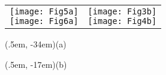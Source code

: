 \documentclass[varwidth=24em]{standalone}
\begin{document}
\begin{tabular}[c]{p{23em}p{50em}}
\shortstack[c]{
 \texttt{[image: Fig5a]} \\
\texttt{[image: Fig6a]}}
& 
\shortstack[c]{
\texttt{[image: Fig3b]}\\[1cm]
\texttt{[image: Fig4b]}\\[0.3cm]}
\end{tabular}
\begin{textblock*}{5em}(.5em, -34em)\sf (a)\end{textblock*}
\begin{textblock*}{5em}(.5em, -17em)\sf (b)\end{textblock*}
\end{document}
